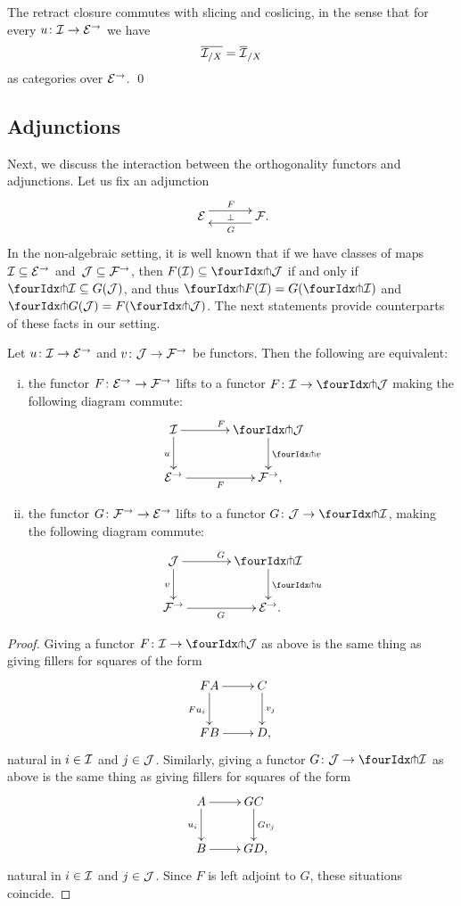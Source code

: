 \documentclass[reqno,10pt,a4paper,oneside,draft]{amsart}
\begin{document}
\begin{proposition}
The retract closure commutes with slicing and coslicing, in the sense that for every $u \co \cal{I} \to \catE^\to$ we have
\[
  \overline{\cal{I}_{/X}} = \overline{\cal{I}}_{/X}
\]
as categories over $\catE^\to$.
\qed
\end{proposition}

\subsection*{Adjunctions}

Next, we discuss the interaction between the orthogonality functors and adjunctions.
Let us fix an adjunction
\[
\xymatrix@C+1em{
  \catE
  \ar@<5pt>[r]^{F}
  \ar@{}[r]|{\bot}
&
  \cal{F}
  \ar@<5pt>[l]^{G}
\rlap{.}}
\]
In the non-algebraic setting, it is well known that if we have classes of maps $\cal{I} \subseteq \catE^\to$ and~$\cal{J} \subseteq \cal{F}^\to$, then $F(\cal{I}) \subseteq \liftl{\cal{J}}$ if and only if $\liftr{\cal{I}} \subseteq G(\cal{J})$, and thus $\liftr{F(\cal{I})} = G(\liftr{\cal{I}})$ and $\liftl{G(\cal{J})} = F(\liftl{\cal{J}})$.
The next statements provide counterparts of these facts in our setting.

\begin{proposition} \label{lift-of-adjunction}
Let $u \co \cal{I} \to \catE^\to$ and $v \co \cal{J} \to \cal{F}^\to$ be functors.
Then the following are equivalent:
\begin{enumerate}[(i)]
\item the functor $F \co \catE^\to \to \cal{F}^\to$ lifts to a functor $F \co \cal{I} \to \liftl{\cal{J}}$ making the following diagram commute:
\[
\xymatrix@C=1.2cm{
  \cal{I}
  \ar[r]^{F}
  \ar[d]_{u}
&
  \liftl{\cal{J}}
  \ar[d]^{\liftl{v}}
\\
  \catE^\to
  \ar[r]_-{F}
&
  \cal{F}^\to
\rlap{,}}
\]
\item the functor $G \co \cal{F}^\to \to \catE^\to$ lifts to a functor $G \co \cal{J} \to \liftr{\cal{I}}$, making the following diagram commute:
\[
\xymatrix@C=1.2cm{
  \cal{J}
    \ar[d]_{v}
\ar[r]^{G}
&
  \liftr{\cal{I}}
  \ar[d]^{\liftr{u}}
\\
  \cal{F}^\to
   \ar[r]_{G}
&
  \catE^\to
\rlap{.}}
\]
\end{enumerate}
\end{proposition}

\begin{proof}
Giving a functor $F \co \cal{I} \to \liftl{\cal{J}}$ as above is the same thing as giving fillers for squares of the form
\[
\xymatrix{
  F A
  \ar[d]_{F u_i}
  \ar[r]
&
  C \ar[d]^{v_j}
\\
  F B
  \ar[r]
&
  D
\rlap{,}}
\]
natural in $i \in \cal{I}$ and $j \in \cal{J}$.
Similarly, giving a functor $G \co \cal{J} \to \liftl{\cal{I}}$ as above is the same thing as giving fillers for squares of the form
\[
\xymatrix{
  A
  \ar[d]_{u_i}
  \ar[r]
&
  G C
  \ar[d]^{G v_j}
\\
  B
  \ar[r]
&
  G D
\rlap{,}}
\]
natural in $i \in \cal{I}$ and $j \in \cal{J}$.
Since $F$ is left adjoint to $G$, these situations coincide.
\end{proof}
\end{document}
